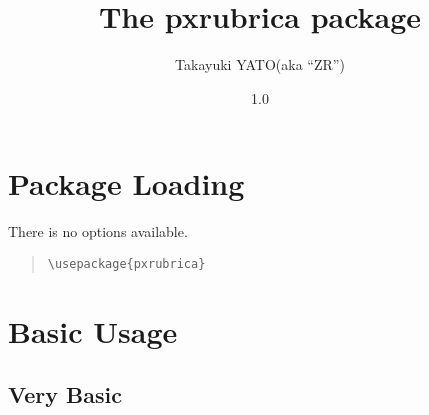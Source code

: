 \documentclass[a4paper]{article}
\newcommand*{\PKN}[1]{\textsf{#1}}
\newcommand*{\myfileversion}{1.0}
\newcommand*{\myfiledate}{2011/09/04}
\begin{document}
\title{The \PKN{pxrubrica} package}
\author{Takayuki YATO\quad (aka ``ZR'')}
\date{\myfileversion \quad[\myfiledate]}
\maketitle


\section{Package Loading}

There is no options available.

\begin{quote}\small\begin{verbatim}
\usepackage{pxrubrica}
\end{verbatim}\end{quote}

\section{Basic Usage}

\subsection{Very Basic}
\end{document}
